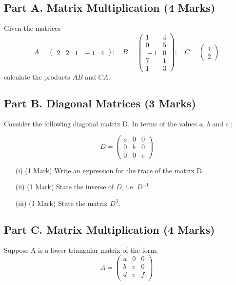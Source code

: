 \documentclass[a4paper,12pt]{article}
\begin{document}
	\subsection*{Part A. Matrix Multiplication (4 Marks)}	
	Given the matrices 
	$$
	A=\left(\begin{array}{ccccc} 
	2&2&1&\!\!\!-1&4\end{array}
	\right); \quad
	B =\left(\begin{array}{cc} 
	1&4\\0&5\\\!\!\!-1&0\\7&1\\1&3\end{array}
	\right); \quad
	C=\left(\begin{array}{c} 1\\2\end{array}
	\right)
	$$
	calculate the products $AB$ and $CA$.
	\subsection*{Part B. Diagonal Matrices (3 Marks)}	
	Consider the following diagonal matrix D. In terms of the values $a$, $b$ and $c$ ;
	
	
	\[D = \left(\begin{array}{ccc}
		a & 0 & 0 \\ 
		0 & b & 0 \\ 
		0 & 0 & c
	\end{array} \right)\]
	\begin{itemize}
		\item[(i)] (1 Mark) Write an expression for the trace of the matrix D.
		\item[(ii)] (1 Mark) State the inverse of $D$, i.e. $D^{-1}$.
		\item[(iii)] (1 Mark) State the matrix $D^3$.
	\end{itemize}
	\smallskip
	\subsection*{Part C. Matrix Multiplication (4 Marks)}	
		Suppose A is a lower triangular matrix of the form;
		\[A = \left(
		\begin{matrix}
		a & 0 & 0 \\
		b & c & 0 \\
		d & e & f \\
		\end{matrix} \right)
		\]
		
\end{document}
